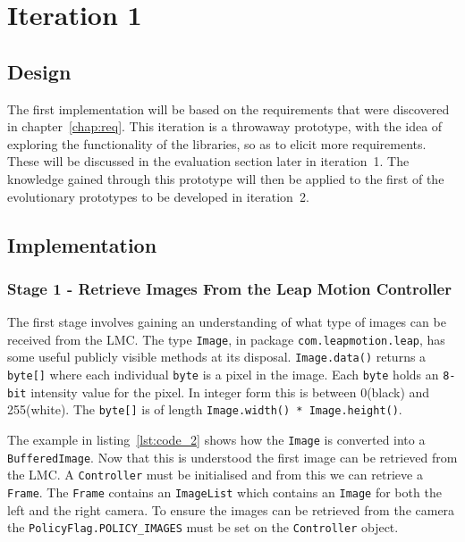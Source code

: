 \documentclass[11pt,oneside]{report}
\newcommand\code[1]{\texttt{#1}}
\begin{document}
	\section{Iteration 1}\label{sec:p1}
		\subsection{Design}
		The first implementation will be based on the requirements that were discovered in chapter~\ref{chap:req}.
		This iteration is a throwaway prototype, with the idea of exploring the functionality of the libraries, so as to elicit more requirements.
		These will be discussed in the evaluation section later in iteration~1.
		The knowledge gained through this prototype will then be applied to the first of the evolutionary prototypes to be developed in iteration~2.
		\subsection{Implementation}
		\subsubsection{Stage 1 - Retrieve Images From the Leap Motion Controller}
		The first stage involves gaining an understanding of what type of images can be received from the LMC.
		The type \code{Image}, in package \code{com.leapmotion.leap}, has some useful publicly visible methods at its disposal.
		\code{Image.data()} returns a \code{byte[]} where each individual \code{byte} is a pixel in the image.
		Each \code{byte} holds an \code{8-bit} intensity value for the pixel. In integer form this is between 0(black) and 255(white).
		The \code{byte[]} is of length \code{Image.width() * Image.height()}.
		
		The example in listing~\ref{lst:code_2} shows how the \code{Image} is converted into a \code{BufferedImage}.
		Now that this is understood the first image can be retrieved from the LMC.
		A \code{Controller} must be initialised and from this we can retrieve a \code{Frame}.
		The \code{Frame} contains an \code{ImageList} which contains an \code{Image} for both the left and the right camera.
		To ensure the images can be retrieved from the camera the \code{PolicyFlag.POLICY\_IMAGES} must be set on the \code{Controller} object.
		
\end{document}
